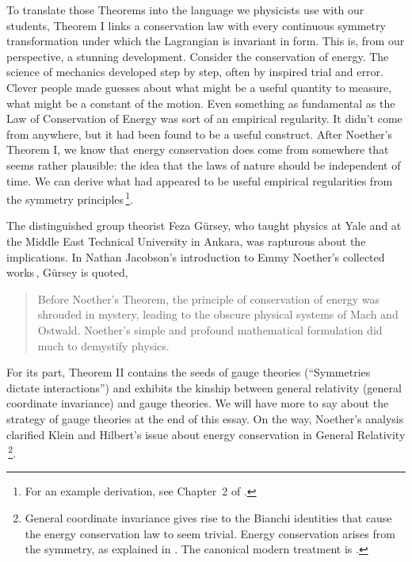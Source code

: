 \documentclass[twoside,symmetric]{tufte-handout}
\begin{document}
To translate those Theorems into the language we physicists use with our students, Theorem I links a conservation law with every continuous symmetry transformation under which the Lagrangian is invariant in form. This is, from our perspective, a stunning development. Consider the conservation of energy. The science of mechanics developed step by step, often by inspired trial and error. Clever people made guesses about what might be a useful quantity to measure, what might be a constant of the motion. Even something as fundamental as the Law of Conservation of Energy was sort of an empirical regularity. It didn't come from anywhere, but it had been found to be a useful construct. After Noether's Theorem I, we know that energy conservation does come from somewhere that seems rather plausible: the idea that the laws of nature should be independent of time. We can derive what had appeared to be useful empirical regularities from the symmetry principles$\,$\footnote{For an example derivation, see Chapter~2 of .}.

The distinguished group theorist Feza Gürsey, who taught physics at Yale and at the Middle East Technical University in Ankara, was rapturous about the implications. In Nathan Jacobson's introduction to Emmy Noether's collected works$\,$\cite{noether1983gesammelte}, Gürsey is quoted,  \begin{quote}Before Noether's Theorem, the principle of conservation of energy was shrouded in mystery, leading to the obscure physical systems of Mach and Ostwald.  Noether's simple and profound mathematical formulation did much to demystify physics.\end{quote}


For its part, Theorem II contains the seeds of gauge theories (``Symmetries dictate interactions'') and exhibits the kinship between general relativity (general coordinate invariance) and gauge theories. We will have more to say about the strategy of gauge theories at the end of this essay.
On the way, Noether's analysis clarified Klein and Hilbert's issue about energy conservation in General Relativity$\,$\footnote[][-56pt]{General coordinate invariance gives rise to the Bianchi identities that cause the energy conservation law to seem trivial. Energy conservation arises from the symmetry, as explained in . The canonical modern treatment is .}.
\end{document}
